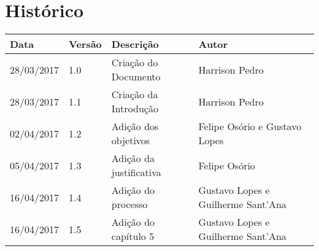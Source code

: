 \chapter{Histórico}

\begin{tabular}{ |p{3cm}|p{3cm}|p{3cm}|p{3cm}|  }
 \hline
 Data 		& 		Versão & 		Descrição 			& 		Autor\\
 \hline\hline
 28/03/2017 & 		1.0    &		Criação do Documento &   	Harrison Pedro	  \\
 \hline
 28/03/2017 & 		1.1    &		Criação da Introdução &   	Harrison Pedro	  \\
 \hline
 02/04/2017 & 		1.2    &		Adição dos objetivos &   	Felipe Osório e Gustavo Lopes	  \\
 \hline
 05/04/2017 & 		1.3    &		Adição da justificativa &   Felipe Osório	  \\
 \hline
 16/04/2017 & 		1.4    &		Adição do processo &   Gustavo Lopes e Guilherme Sant'Ana	  \\
 \hline
 16/04/2017 & 		1.5    &		Adição do capítulo 5 &   Gustavo Lopes e Guilherme Sant'Ana	  \\
 \hline
\end{tabular}

